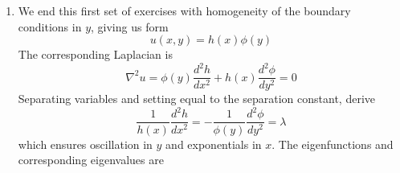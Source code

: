 \documentclass[a4paper]{article}
\begin{document}
\begin{enumerate}[label=(\alph*)]
	\[
		\frac{1}{\phi \!\left( x \right)}\frac{d^2 \phi}{d x^2} = -\frac{1}{h \!\left( y \right)}\frac{d^2 h}{d y^2} = -\lambda 
	\]
	which guarantees oscillation in \( x \) and exponentials in \( y \). The eigenfunctions and corresponding eigenvalues are
	\begin{center}
		\renewcommand{\arraystretch}{1.8}
		\setlength{\arraycolsep}{10pt}
		\begin{tabular}{|c||c|c|}
			\hline
			\rule[-1.2em]{0pt}{3em}
			 & \( \lambda_{0} = 0 \) & \( \lambda_{n} = \displaystyle{\!\left( \frac{n \pi}{L} \right)^{2}} > 0 \) \\
			\hline\hline
			\rule[-1.2em]{0pt}{3em}
					\( \phi \!\left( x \right) \) & \( c_{1} \) & \( \displaystyle{\cos\!\left(\frac{n \pi x}{L}\right)} \) \\
			\hline
			\rule[-1.2em]{0pt}{3em}
					\( h \!\left( y \right) \) & \( a_{1} \) & \( \displaystyle{\cosh\!\left[\frac{n \pi}{L}\!\left( y - H \right)\right]} \) \\
			\hline
		\end{tabular}
	\end{center}
	which combine and with superposition produce
	\[
		u \!\left( x,y \right) = A_{0} + \sum^{\infty}_{n=1} A_{n}\cos\!\left(\frac{n \pi x}{L}\right)\cosh\!\left[\frac{n \pi}{L}\!\left( y - H \right)\right]
	\]
	where 
	\[
	A_{0} = \frac{1}{2}, \quad A_{m} = \frac{2}{m \pi \cosh\!\left(m \pi H / L\right)}\sin\!\left(\frac{m \pi}{2}\right)
	\]
	Note that the derivation proceeds analogously to the problem posed in (a), where the presence of non-trivial eigenfunctions corresponding to \( \lambda_{0} = 0 \) indicates two different projections of the boundary condition onto the eigenbases associated with the zero and non-zero eigenvalues.
	\item We end this first set of exercises with homogeneity of the boundary conditions in \( y \), giving us form
	\[
		u \!\left( x,y \right) = h \!\left( x \right)\phi \!\left( y \right) 
	\]
	The corresponding Laplacian is
	\[
		\nabla^{2}u = \phi \!\left( y \right)\frac{d^2 h}{d x^2} + h \!\left( x \right)\frac{d^2 \phi}{d y^2} = 0
	\]
	Separating variables and setting equal to the separation constant, derive
	\[
		\frac{1}{h \!\left( x \right)}\frac{d^2 h}{d x^2} = -\frac{1}{\phi \!\left( y \right)}\frac{d^2 \phi}{d y^2} = \lambda 
	\]
	which ensures oscillation in \( y \) and exponentials in \( x \). The eigenfunctions and corresponding eigenvalues are
	\begin{center}
		\renewcommand{\arraystretch}{1.8}
		\setlength{\arraycolsep}{10pt}

\end{center}
\end{enumerate}
\end{document}
